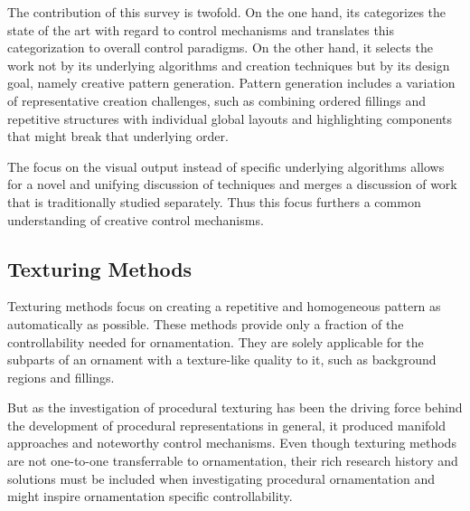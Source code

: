 The contribution of this survey is twofold. On the one hand, its categorizes the state of the art with regard to control mechanisms and translates this categorization to overall control paradigms.
On the other hand, it selects the work not by its underlying algorithms and creation techniques but by its design goal, namely creative pattern generation. Pattern generation includes a variation of representative creation challenges, such as combining ordered fillings and repetitive structures with individual global layouts and highlighting components that might break that underlying order. 

The focus on the visual output instead of specific underlying algorithms allows for a novel and unifying discussion of techniques and merges a discussion of work that is traditionally studied separately. Thus this focus furthers a common understanding of creative control mechanisms.





\subsection{Texturing Methods}
\label{subsec:analysis_texturing_methods}

Texturing methods focus on creating a repetitive and homogeneous pattern as automatically as possible. These methods provide only a fraction of the controllability needed for ornamentation. They are solely applicable for the subparts of an ornament with a texture-like quality to it, such as background regions and fillings.

But as the investigation of procedural texturing has been the driving force behind the development of procedural representations in general, it produced manifold approaches and noteworthy control mechanisms. Even though texturing methods are not one-to-one transferrable to ornamentation, their rich research history and solutions must be included when investigating procedural ornamentation and might inspire ornamentation specific controllability.



